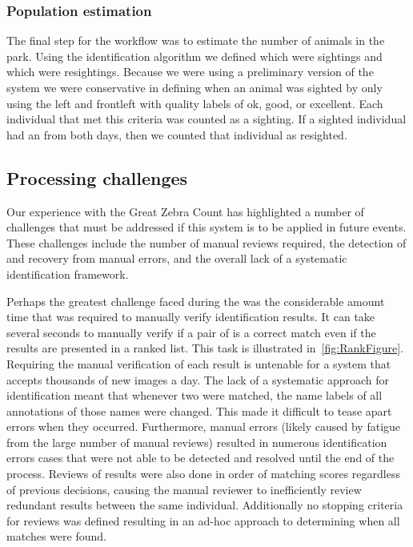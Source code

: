         \subsubsection{Population estimation}
            The final step for the \GZC{} workflow was to estimate the number of animals in the park.  Using the
            identification algorithm we defined which \annots{} were sightings and which were resightings. Because we
            were using a preliminary version of the system we were conservative in defining when an animal was sighted
            by only using the left and frontleft \annots{} with quality labels of ok, good, or excellent.  Each
            individual that met this criteria was counted as a sighting.  If a sighted individual had an \annot{} from
            both days, then we counted that individual as resighted.

    \subsection{Processing challenges}
        Our experience with the Great Zebra Count has highlighted a number of challenges that must be addressed if this
        system is to be applied in future events. These challenges include the number of manual reviews required, the
        detection of and recovery from manual errors, and the overall lack of a systematic identification framework.

        Perhaps the greatest challenge faced during the \GZC{} was the
          considerable amount time that was required to manually verify
          identification results.
        It can take several seconds to manually verify if a pair of \annots{}
          is a correct match even if the results are presented in a ranked list.
        This task is illustrated in~\cref{fig:RankFigure}.
        Requiring the manual verification of each result is untenable for a
          system that accepts thousands of new images a day.
        The lack of a systematic approach for identification meant that
          whenever two \annots{} were matched, the name labels of all
          annotations of those names were changed.
        This made it difficult to tease apart errors when they occurred.
        Furthermore, manual errors (likely caused by fatigue from the large
          number of manual reviews) resulted in numerous identification errors
          cases that were not able to be detected and resolved until the end of
          the process.
        Reviews of results were also done in order of matching scores
          regardless of previous decisions, causing the manual reviewer to
          inefficiently review redundant results between the same individual.
        Additionally no stopping criteria for reviews was defined resulting in
          an ad-hoc approach to determining when all matches were found.

